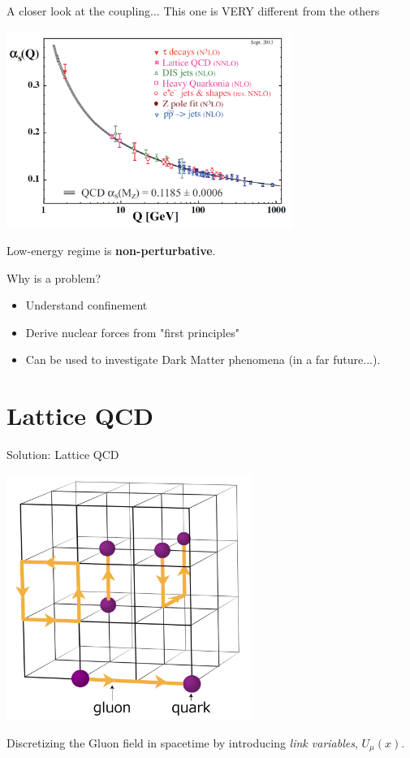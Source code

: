 \documentclass[10pt]{beamer}
\begin{document}
\begin{frame}{A closer look at the coupling...}
	This one is VERY different from the others
	\begin{center}
		\includegraphics[width=0.7\textwidth]{figures/qcd_coupling.png}
	\end{center}
	Low-energy regime is \textbf{non-perturbative}.
\end{frame}

\begin{frame}{Why is a problem?}
	\begin{itemize}
		\item Understand confinement
		\item Derive nuclear forces from "first principles"
		\item Can be used to investigate Dark Matter phenomena (in a far future...).
	\end{itemize}
\end{frame}

\section{Lattice QCD}

\begin{frame}{Solution: Lattice QCD}
	\begin{center}
		\includegraphics[width=0.6\textwidth]{figures/LatticeQCD.png}
	\end{center}

	Discretizing the Gluon field in spacetime by introducing \textit{link variables}, $U_\mu(x)$.
\end{frame}
\end{document}
